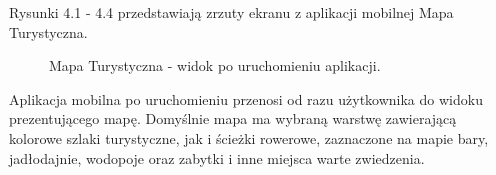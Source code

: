 Rysunki 4.1 - 4.4 przedstawiają zrzuty ekranu z aplikacji mobilnej Mapa Turystyczna.
\begin{figure}[H]
    \centering
    \caption{Mapa Turystyczna - widok po uruchomieniu aplikacji.}
    \label{mapatu:mapa}
\end{figure}
Aplikacja mobilna po uruchomieniu przenosi od razu użytkownika do widoku prezentującego mapę. Domyślnie mapa ma wybraną warstwę zawierającą kolorowe szlaki turystyczne, jak i ścieżki rowerowe, zaznaczone na mapie bary, jadłodajnie, wodopoje oraz zabytki i inne miejsca warte zwiedzenia.


